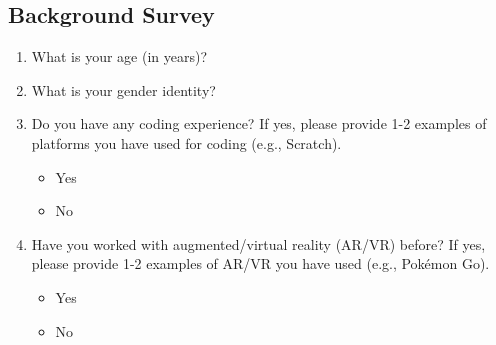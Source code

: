 \documentclass[sigconf,nonacm]{acmart}
\begin{document}
\subsection{Background Survey}
\begin{enumerate}
    \item What is your age (in years)? 
    \item What is your gender identity?
    \item Do you have any coding experience? If yes, please provide 1-2 examples of platforms you have used for coding (e.g., Scratch).
    \begin{itemize}
        \item [] Yes
        \item [] No
    \end{itemize}
    \item Have you worked with augmented/virtual reality (AR/VR) before? If yes, please provide 1-2 examples of AR/VR you have used (e.g., Pokémon Go).
    \begin{itemize}
        \item [] Yes
        \item [] No
    \end{itemize}
\end{enumerate}
\end{document}
